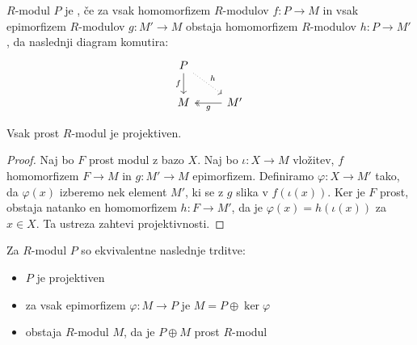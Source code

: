 

\begin{definicija}
  $R$-modul $P$ je , če za vsak homomorfizem $R$-modulov $f:
  P \to M$ in vsak epimorfizem $R$-modulov $g: M' \to M$ obstaja homomorfizem
  $R$-modulov $h: P \to M'$, da naslednji diagram komutira:
  \[\begin{tikzcd}
	  P \\
	  M & {M'}
	  \arrow["f"', from=1-1, to=2-1]
	  \arrow["h", dotted, from=1-1, to=2-2]
	  \arrow["g", two heads, from=2-2, to=2-1]
	\end{tikzcd}\]
\end{definicija}


\begin{trditev}
  Vsak prost $R$-modul je projektiven.
\end{trditev}

\begin{proof}
  Naj bo $F$ prost modul z bazo $X$.
  Naj bo $\iota : X \to M$ vložitev, $f$ homomorfizem $F \to M$ in $g: M' \to M$
  epimorfizem.
  Definiramo $\varphi: X \to M'$ tako, da $\varphi(x)$ izberemo nek element
  $M'$, ki se z $g$ slika v $f(\iota(x))$.
  Ker je $F$ prost, obstaja natanko en homomorfizem $h: F \to M'$, da je
  $\varphi(x) = h(\iota(x))$ za $x \in X$.
  Ta ustreza zahtevi projektivnosti.
\end{proof}


\begin{izrek}
  Za $R$-modul $P$ so ekvivalentne naslednje trditve:
  \begin{itemize}
  \item $P$ je projektiven
  \item za vsak epimorfizem $\varphi: M \to P$ je $M = P \oplus \ker \varphi$
  \item obstaja $R$-modul $M$, da je $P \oplus M$ prost $R$-modul
  \end{itemize}
\end{izrek}

